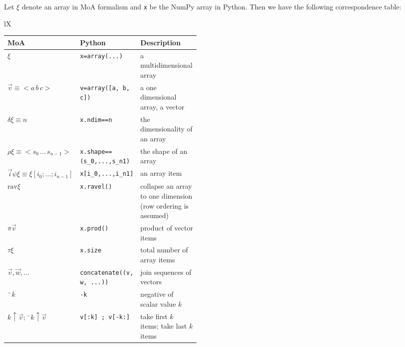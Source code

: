 \usepackage{amsmath,amssymb}
\usepackage[margin=2cm]{geometry}

\usepackage{tabularx,booktabs}

\newcommand{\dims}{\delta}
\newcommand{\shape}{\rho}
\newcommand{\size}{\tau}
\newcommand{\product}{\pi}
\newcommand{\ravel}{\mathrm{rav}}
\newcommand{\take}[2]{{#1 \uparrow #2}}
\newcommand{\drop}[2]{{#1 \downarrow #2}}
\newcommand{\minus}[1]{{}^{-}{#1}}




Let $\xi$ denote an array in MoA formalism
and \verb|x| be the NumPy array in Python. Then we have the following
correspondence table:\\[2ex]
\begin{tabularx}{\textwidth}{lX}
\begin{tabular}[m]{l|l|m{0.45\linewidth}|}
  MoA & Python & Description \\\hline
  $\xi$ & \verb|x=array(...)| 
               & a multidimensional array\\
  $\vec v\equiv<a\, b\, c>$ & \verb|v=array([a, b, c])| 
               & a one dimensional array, a vector\\
  $\dims\xi\equiv n$ & \verb|x.ndim==n| 
               & the dimensionality of an array \\
  $\shape\xi\equiv<s_0\, \ldots\, s_{n-1}>$ & \verb|x.shape==(s_0,...,s_n1)| 
               & the shape of an array \\
  $\vec i\psi\xi\equiv\xi[i_0;\ldots;i_{n-1}]$ & \verb|x[i_0,...,i_n1]| 
               & an array item\\
  $\ravel \xi$ & \verb|x.ravel()| 
               & collapse an array to one dimension (row ordering is assumed)\\
  $\product\vec v$ & \verb|x.prod()| 
               & product of vector items\\
  $\size\xi$   & \verb|x.size| 
               & total number of array items\\
  $\vec v,\vec w,\ldots$ & \verb|concatenate((v, w, ...))|
               & join sequences of vectors\\
  $\minus k$ & \verb|-k| & negative of scalar value $k$\\
  $\take k{\vec v}; \take{\minus k}{\vec v} $&\verb|v[:k] ; v[-k:]|
               & take first $k$ items; take last $k$ items\\

                                                           
\end{tabular}  
\end{tabularx}
